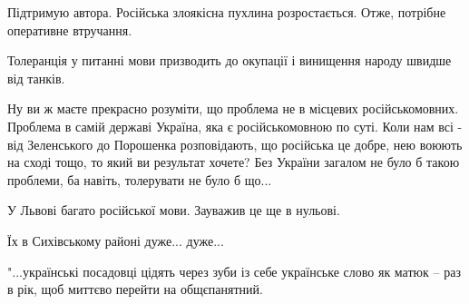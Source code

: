 \begin{itemize}
Підтримую автора. Російська злоякісна пухлина розростається. Отже, потрібне оперативне втручання\Laughey[1.0][white].

 
Толеранція у питанні мови призводить до окупації і винищення народу швидше від танків.

\begin{itemize}
 

Ну ви ж маєте прекрасно розуміти, що проблема не в місцевих російськомовних.
Проблема в самій державі Україна, яка є російськомовною по суті. Коли нам всі -
від Зеленського до Порошенка розповідають, що російська це добре, нею воюють на
сході тощо, то який ви результат хочете? Без України загалом не було б такою
проблеми, ба навіть, толерувати не було б що...

\end{itemize}

 
У Львові багато російської мови. Зауважив це ще в нульові.

 
Їх в Сихівському районі дуже... дуже...

 

"...українські посадовці цідять через зуби із себе українське слово як матюк –
раз в рік, щоб миттєво перейти на общєпанятний.


\end{itemize}
